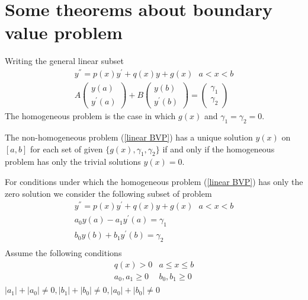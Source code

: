 \section{Some theorems about {boundary value problem}}
Writing the general linear subset 
\begin{equation}\label{linear BVP}
\begin{array}{l}
y^{''}=p(x)y^{'}+q(x)y+g(x) \ \ \ a < x < b \\
A\left(\begin{array}{c} y(a) \\ y^{'}(a) \end{array} \right)
+
B\left(\begin{array}{c} y(b) \\ y^{'}(b) \end{array} \right)
=
\left(\begin{array}{c} \gamma_1 \\ \gamma_2 \end{array} \right)
\end{array}
\end{equation}
The homogeneous problem is the case in which $g(x)$ and $\gamma_1=\gamma_2=0$.
\begin{theorem}
The non-homogeneous problem (\ref{linear BVP}) has a unique solution $y(x)$ on 
$[a,b]$ for each set of given $\{g(x),\gamma_1,\gamma_2 \}$ if and only if the 
homogeneous problem has only the trivial solutions $y(x)=0$.
\end{theorem}
For conditions under which the homogeneous problem (\ref{linear BVP}) has only
the zero solution we consider the following subset of problem
\begin{equation}\label{linear subset BVP}
\begin{array}{l}
y^{''}=p(x)y^{'}+q(x)y+g(x) \ \ \ a < x < b \\
a_0 y(a)-a_1  y^{'}(a) =\gamma_1 \\
 b_0y(b) +b_1 y^{'}(b) = \gamma_2 \\
\end{array}
\end{equation}
Assume the following conditions
\begin{equation}
\begin{array}{ll}
q(x)>0 & a\leq x \leq b \\
a_0,a_1 \geq 0 & b_0,b_1 \geq 0 \\
\end{array}
\end{equation}
$|a_1|+|a_0|\not= 0, |b_1|+|b_0|\not= 0,|a_0|+|b_0|\not= 0$
